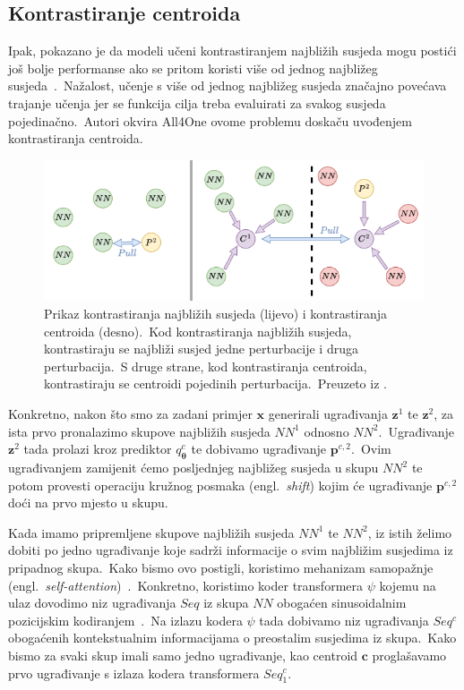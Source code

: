 \documentclass[diplomskirad]{fer}
\begin{document}
\pagebreak

\subsection{Kontrastiranje centroida}
\label{sub:centroids}
  
Ipak, pokazano je da modeli učeni kontrastiranjem najbližih susjeda mogu postići još bolje performanse ako se pritom koristi više od jednog najbližeg susjeda~\cite{koohpayegani2021mean}.\ 
Nažalost, učenje s više od jednog najbližeg susjeda značajno povećava trajanje učenja jer se funkcija cilja treba evaluirati za svakog susjeda pojedinačno.\ 
Autori okvira All4One ovome problemu doskaču uvođenjem kontrastiranja centroida.\ 

\begin{figure}[h]
  \centering
  \includegraphics[scale=1]{./Slike/neighbour_vs_centroid.png}
  \caption{Prikaz kontrastiranja najbližih susjeda (lijevo) i kontrastiranja centroida (desno).\ Kod kontrastiranja najbližih susjeda, kontrastiraju se najbliži susjed jedne perturbacije i druga perturbacija.\ S druge strane, kod kontrastiranja centroida, kontrastiraju se centroidi pojedinih perturbacija.\ Preuzeto iz \cite{estepa2023all4one}.}
  \label{fig:neighbour_vs_centroid}
\end{figure}

Konkretno, nakon što smo za zadani primjer $\bm{x}$ generirali ugrađivanja $\bm{z}^1$ te $\bm{z}^2$, za ista prvo pronalazimo skupove najbližih susjeda $NN^1$ odnosno $NN^2$.\ 
Ugrađivanje $\bm{z}^2$ tada prolazi kroz prediktor $q_{\bm{\theta}}^{c}$ te dobivamo ugrađivanje $\bm{p}^{c, 2}$.\ Ovim ugrađivanjem zamijenit ćemo posljednjeg najbližeg susjeda u skupu $NN^2$ te potom provesti operaciju kružnog posmaka (engl.\ \textit{shift}) kojim će ugrađivanje $\bm{p}^{c, 2}$ doći na prvo mjesto u skupu.\ 
  
Kada imamo pripremljene skupove najbližih susjeda $NN^1$ te $NN^2$, iz istih želimo dobiti po jedno ugrađivanje koje sadrži informacije o svim najbližim susjedima iz pripadnog skupa.\ 
Kako bismo ovo postigli, koristimo mehanizam samopažnje (engl.\ \textit{self-attention})~\cite{vaswani2017attention}.\
Konkretno, koristimo koder transformera $\psi$ kojemu na ulaz dovodimo niz ugrađivanja $Seq$ iz skupa $NN$ obogaćen sinusoidalnim pozicijskim kodiranjem~\cite{vaswani2017attention}.\ 
Na izlazu kodera $\psi$ tada dobivamo niz ugrađivanja $Seq^c$ obogaćenih kontekstualnim informacijama o preostalim susjedima iz skupa.\ Kako bismo za svaki skup imali samo jedno ugrađivanje, kao centroid $\bm{c}$ proglašavamo prvo ugrađivanje s izlaza kodera transformera $Seq_1^c$.\ 
\end{document}
